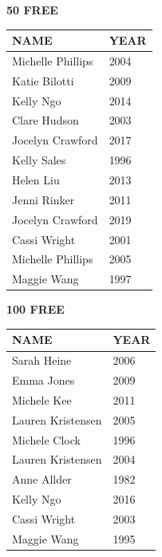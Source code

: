 \begin{table}[H]
\centering
\begin{minipage}[t]{0.48\textwidth}
\centering
\textbf{50 FREE}\\[0.1cm]
\begin{tabular}{@{}p{2.8cm}p{1.2cm}@{}}
\hline
    \textbf{NAME} & \textbf{YEAR} \\
\hline
    Michelle Phillips & 2004 \\
    Katie Bilotti & 2009 \\
    Kelly Ngo & 2014 \\
    Clare Hudson & 2003 \\
    Jocelyn Crawford & 2017 \\
    Kelly Sales & 1996 \\
    Helen Liu & 2013 \\
    Jenni Rinker & 2011 \\
    Jocelyn Crawford & 2019 \\
    Cassi Wright & 2001 \\
    Michelle Phillips & 2005 \\
    Maggie Wang & 1997 \\
\hline
\end{tabular}
\end{minipage}\hfill
\begin{minipage}[t]{0.48\textwidth}
\centering
\textbf{100 FREE}\\[0.1cm]
\begin{tabular}{@{}p{2.8cm}p{1.2cm}@{}}
\hline
    \textbf{NAME} & \textbf{YEAR} \\
\hline
    Sarah Heine & 2006 \\
    Emma Jones & 2009 \\
    Michele Kee & 2011 \\
    Lauren Kristensen & 2005 \\
    Michele Clock & 1996 \\
    Lauren Kristensen & 2004 \\
    Anne Allder & 1982 \\
    Kelly Ngo & 2016 \\
    Cassi Wright & 2003 \\
    Maggie Wang & 1995 \\
\hline
\end{tabular}
\end{minipage}
\end{table}

